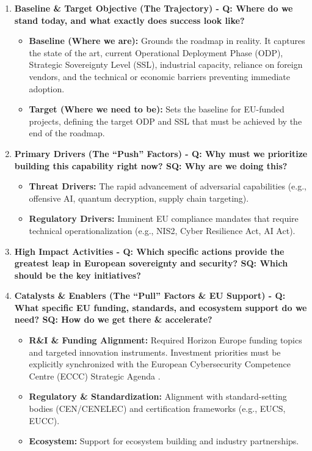\documentclass[12pt,a4paper]{report}
\begin{document}
\begin{enumerate}
    \item \textbf{Baseline \& Target Objective (The Trajectory) - Q: Where do we stand today, and what exactly does success look like?}
    \begin{itemize}
    \item \textbf{Baseline (Where we are):} Grounds the roadmap in reality. It captures the state of the art, current Operational Deployment Phase (ODP), Strategic Sovereignty Level (SSL), industrial capacity, reliance on foreign vendors, and the technical or economic barriers preventing immediate adoption.
    \item \textbf{Target (Where we need to be):} Sets the baseline for EU-funded projects, defining the target ODP and SSL that must be achieved by the end of the roadmap.
\end{itemize}
    
    \item \textbf{Primary Drivers (The ``Push'' Factors) - Q: Why must we prioritize building this capability right now? SQ: Why are we doing this?}
    \begin{itemize}
        \item \textbf{Threat Drivers:} The rapid advancement of adversarial capabilities (e.g., offensive AI, quantum decryption, supply chain targeting).
        \item \textbf{Regulatory Drivers:} Imminent EU compliance mandates that require technical operationalization (e.g., NIS2, Cyber Resilience Act, AI Act).
    \end{itemize}

    \item \textbf{High Impact Activities - Q: Which specific actions provide the greatest leap in European sovereignty and security? SQ: Which should be the key initiatives?}

    \item \textbf{Catalysts \& Enablers (The ``Pull'' Factors \& EU Support) - Q: What specific EU funding, standards, and ecosystem support do we need? SQ: How do we get there \& accelerate?}
    \begin{itemize}
        \item \textbf{R\&I \& Funding Alignment:} Required Horizon Europe funding topics and targeted innovation instruments. Investment priorities must be explicitly synchronized with the European Cybersecurity Competence Centre (ECCC) Strategic Agenda \cite{eccc}.
        \item \textbf{Regulatory \& Standardization:} Alignment with standard-setting bodies (CEN/CENELEC) and certification frameworks (e.g., EUCS, EUCC).
        \item \textbf{Ecosystem:} Support for ecosystem building and industry partnerships.
    \end{itemize}


\end{enumerate}
\end{document}

